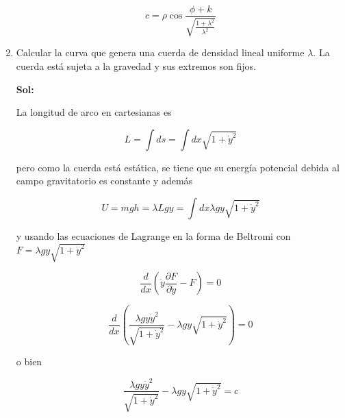 \documentclass[12pt,a4paper]{article}
\begin{document}
\begin{enumerate}
        \begin{equation*}
            c = \rho \cos{\frac{\phi + k
            }{  \sqrt{\frac{1 + \lambda^2}{\lambda^2}}}}
        \end{equation*}
        
        
        
        
        
        
        
        
        \item Calcular la curva que genera una cuerda de densidad lineal uniforme $\lambda$. La cuerda está sujeta a la gravedad y sus extremos son fijos.
        
        \textbf{Sol:}
        
        La longitud de arco en cartesianas es
        
        \begin{equation*}
            L = \int ds = \int dx \sqrt{1+ \dot{y}^2}
        \end{equation*}
        
        pero como la cuerda está estática, se tiene que su energía potencial debida al campo gravitatorio es constante y además
        
        \begin{equation*}
            U =mgh = \lambda L g y =  \int dx \lambda g y \sqrt{1 + \dot{y}^2}
        \end{equation*}
        
        y usando las ecuaciones de Lagrange en la forma de Beltromi con $F= \lambda g y \sqrt{1+ \dot{y}^2}$
        
        \begin{equation*}
            \frac{d}{d x}\left( \dot{y}\frac{\partial F}{\partial \dot{y}}-F\right) = 0
        \end{equation*}
        
        \begin{equation*}
            \frac{d}{d x}\left(\frac{\lambda g y \dot{y}^2}{\sqrt{1 + \dot{y}^2}} -  \lambda g  y \sqrt{1 + \dot{y}^2} \right) = 0
        \end{equation*}
        
        o bien
        
        \begin{equation*}
             \frac{\lambda g y \dot{y}^2}{\sqrt{1 + \dot{y}^2}} -  \lambda g  y \sqrt{1 + \dot{y}^2} = c
        \end{equation*}
        

\end{enumerate}
\end{document}
